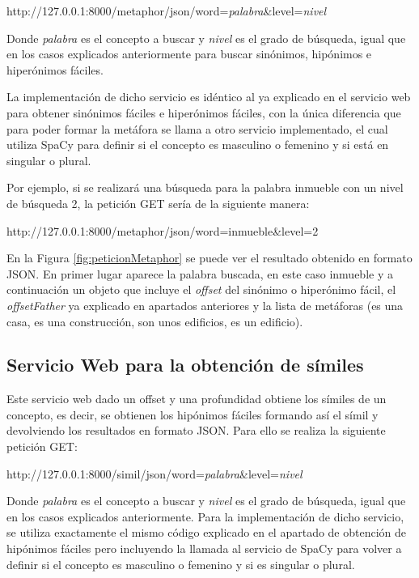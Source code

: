 http://127.0.0.1:8000/metaphor/json/word=\textit{palabra}\&level=\textit{nivel}

Donde \textit{palabra} es el concepto a buscar y \textit{nivel} es el grado de búsqueda, igual que en los casos explicados anteriormente para buscar sinónimos, hipónimos e hiperónimos fáciles.

La implementación de dicho servicio es idéntico al ya explicado en el servicio web para obtener sinónimos fáciles e hiperónimos fáciles, con la única diferencia que para poder formar la metáfora se llama a otro servicio implementado, el cual utiliza SpaCy para definir si el concepto es masculino o femenino y si está en singular o plural.

Por ejemplo, si se realizará una búsqueda para la palabra inmueble con un nivel de búsqueda 2, la petición GET sería de la siguiente manera:

http://127.0.0.1:8000/metaphor/json/word=inmueble\&level=2

En la Figura \ref{fig:peticionMetaphor} se puede ver el resultado obtenido en formato JSON. En primer lugar aparece la palabra buscada, en este caso inmueble y a continuación un objeto que incluye el \textit{offset} del sinónimo o hiperónimo fácil, el \textit{offsetFather}  ya explicado en apartados anteriores y la lista de metáforas (es una casa, es una construcción, son unos edificios, es un edificio). 


\subsection{Servicio Web  para la obtención de símiles}
\label{cap:subsec:sw_simil}
Este servicio web dado un offset y una profundidad obtiene los símiles de un concepto, es decir, se obtienen los hipónimos fáciles formando así el símil y devolviendo los resultados en formato JSON.
Para ello se realiza la siguiente petición GET:

http://127.0.0.1:8000/simil/json/word=\textit{palabra}\&level=\textit{nivel}

Donde \textit{palabra} es el concepto a buscar y \textit{nivel} es el grado de búsqueda, igual que en los casos explicados anteriormente.
Para la implementación de dicho servicio, se utiliza exactamente el mismo código explicado en el apartado de obtención de hipónimos fáciles pero incluyendo la llamada al servicio de SpaCy para volver a definir si el concepto es masculino o femenino y si es singular o plural.

